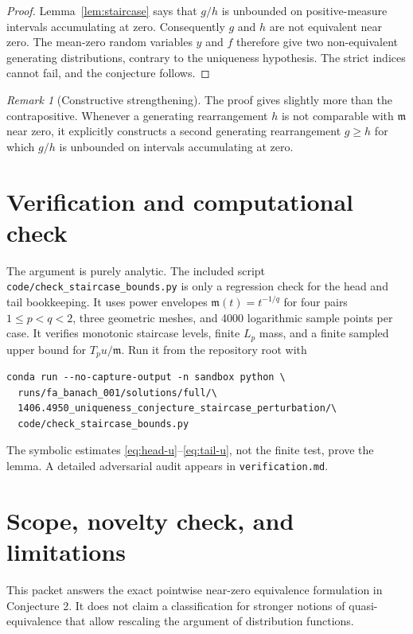 \documentclass[11pt]{article}
\theoremstyle{definition}
\theoremstyle{remark}
\newtheorem{remark}[theorem]{Remark}
\newcommand{\Tp}{T_p}
\newcommand{\mfun}{\mathfrak m}
\begin{document}
\begin{proof}
Lemma~\ref{lem:staircase} says that $g/h$ is unbounded on positive-measure
intervals accumulating at zero.  Consequently $g$ and $h$ are not equivalent
near zero.  The mean-zero random variables $y$ and $f$ therefore give two
non-equivalent generating distributions, contrary to the uniqueness
hypothesis.  The strict indices cannot fail, and the conjecture follows.
\end{proof}

\begin{remark}[Constructive strengthening]
The proof gives slightly more than the contrapositive.  Whenever a generating
rearrangement $h$ is not comparable with $\mfun$ near zero, it explicitly
constructs a second generating rearrangement $g\geq h$ for which $g/h$ is
unbounded on intervals accumulating at zero.
\end{remark}

\section{Verification and computational check}

The argument is purely analytic.  The included script
\texttt{code/check\_staircase\_bounds.py} is only a regression check for the
head and tail bookkeeping.  It uses power envelopes
$\mfun(t)=t^{-1/q}$ for four pairs $1\leq p<q<2$, three geometric meshes, and
4000 logarithmic sample points per case.  It verifies monotonic staircase
levels, finite $L_p$ mass, and a finite sampled upper bound for
$\Tp u/\mfun$.  Run it from the repository root with
\begin{verbatim}
conda run --no-capture-output -n sandbox python \
  runs/fa_banach_001/solutions/full/\
  1406.4950_uniqueness_conjecture_staircase_perturbation/\
  code/check_staircase_bounds.py
\end{verbatim}
The symbolic estimates \eqref{eq:head-u}--\eqref{eq:tail-u}, not the finite
test, prove the lemma.  A detailed adversarial audit appears in
\texttt{verification.md}.

\section{Scope, novelty check, and limitations}

This packet answers the exact pointwise near-zero equivalence formulation in
Conjecture 2.  It does not claim a classification for stronger notions of
quasi-equivalence that allow rescaling the argument of distribution
functions.
\end{document}

